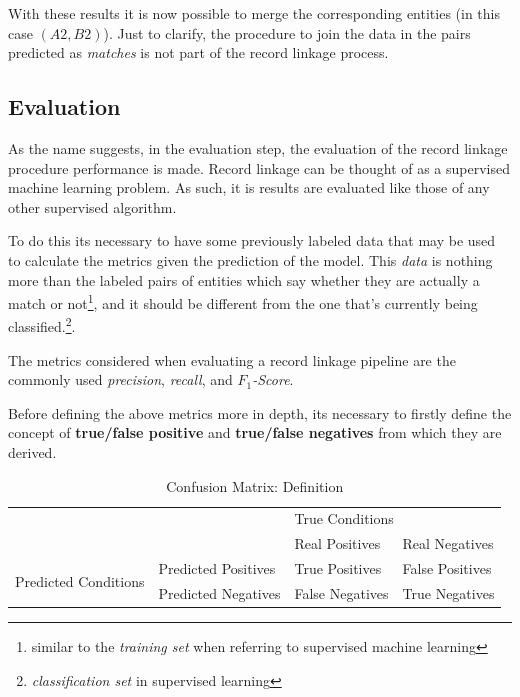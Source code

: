 \documentclass[epsfig,a4paper,11pt,titlepage,twoside,openany]{book}
\begin{document}
With these results it is now possible to merge the corresponding entities (in this case $(A2, B2)$). Just to clarify, the procedure to join the data in the pairs predicted as \textit{matches} is not part of the record linkage process.



\subsection{Evaluation}
\label{sec:rl-workflow-evaluation}

As the name suggests, in the evaluation step, the evaluation of the record linkage procedure performance is made. Record linkage can be thought of as a supervised machine learning problem. As such, it is results are evaluated like those of any other supervised algorithm.

To do this its necessary to have some previously labeled data that  may  be used to calculate the metrics given the prediction of the model. This \textit{data} is nothing more than the labeled pairs of entities which say whether they are actually a match or not\footnote{similar to the \textit{training set} when referring to supervised machine learning}, and it should be different from the one that’s currently being classified.\footnote{\textit{classification set} in supervised learning}.

The metrics considered when evaluating a record linkage pipeline are the commonly used
\cite{Powers2011_evaluation} \textit{precision}, \textit{recall}, and
\textit{$F_1$-Score}.

Before defining the above metrics more in depth, its necessary to firstly define the concept of \textbf{true/false positive} and \textbf{true/false negatives} from which they are derived.

\begin{table}[H]
  \centering
  \begin{tabular}{ll|l|l|}
    \cline{3-4}
    &                     & \multicolumn{2}{l|}{True Conditions} \\ \cline{3-4} 
    &                     & Real Positives  & Real Negatives     \\ \hline
    \multicolumn{1}{|l|}{\multirow{2}{*}{Predicted Conditions}} & Predicted Positives & True Positives  & False Positives    \\ \cline{2-4} 
    \multicolumn{1}{|l|}{}                                      & Predicted Negatives & False Negatives & True Negatives     \\ \hline
  \end{tabular}
  \caption{Confusion Matrix: Definition}
  \label{tab:confusion-matrix-definition}
\end{table}
\end{document}
